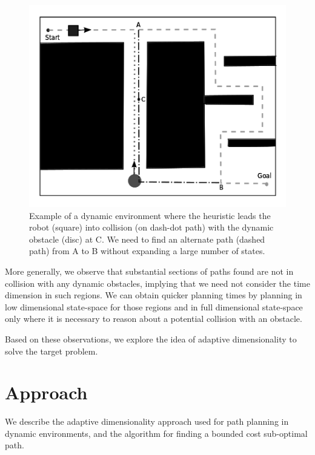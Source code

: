 \begin{figure}[tb!]
\centering%
\includegraphics[scale=0.4]{Figures/intro.png}%
\caption{Example of a dynamic environment where the heuristic leads the robot (square) into collision (on dash-dot path) with the dynamic obstacle (disc) at C. We need to find an alternate path (dashed path) from A to B without expanding a large number of states.}%
\label{fig:intro}
\end{figure}

More generally, we observe that substantial sections of paths found are not in collision with any dynamic obstacles, implying that we need not consider the time dimension in such regions. We can obtain quicker planning times by planning in low dimensional state-space for those regions and in full dimensional state-space only where it is necessary to reason about a potential collision with an obstacle. 

Based on these observations, we explore the idea of adaptive dimensionality to solve the target problem.

\section{Approach}\label{sec:approach}

We describe the adaptive dimensionality approach used for path planning in dynamic environments, and the algorithm for finding a bounded cost sub-optimal path.


